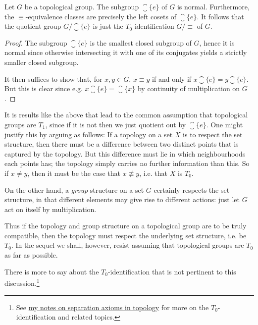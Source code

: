 \documentclass[article, a4paper, 11pt, oneside]{memoir}
\numberwithin{equation}{chapter}
\begin{document}
\begin{proposition}
    \label{thm:quotient-group-T0-identification}
    Let $G$ be a topological group. The subgroup $\closure{\{e\}}$ of $G$ is normal. Furthermore, the $\equiv$-equivalence classes are precisely the left cosets of $\closure{\{e\}}$. It follows that the quotient group $G / \closure{\{e\}}$ is just the $T_0$-identification $G/{\equiv}$ of $G$.
\end{proposition}

\begin{proof}
    The subgroup $\closure{\{e\}}$ is the smallest closed subgroup of $G$, hence it is normal since otherwise intersecting it with one of its conjugates yields a strictly smaller closed subgroup.

    It then suffices to show that, for $x,y \in G$, $x \equiv y$ if and only if $x \closure{\{e\}} = y \closure{\{e\}}$. But this is clear since e.g. $x \closure{\{e\}} = \closure{\{x\}}$ by continuity of multiplication on $G$.
\end{proof}

It is results like the above that lead to the common assumption that topological groups are $T_1$, since if it is not then we just quotient out by $\closure{\{e\}}$. One might justify this by arguing as follows: If a topology on a set $X$ is to respect the set structure, then there must be a difference between two distinct points that is captured by the topology. But this difference must lie in which neighbourhoods each points has; the topology simply carries no further information than this. So if $x \neq y$, then it must be the case that $x \not\equiv y$, i.e. that $X$ is $T_0$.

On the other hand, a \emph{group} structure on a set $G$ certainly respects the set structure, in that different elements may give rise to different actions: just let $G$ act on itself by multiplication.

Thus if the topology and group structure on a topological group are to be truly compatible, then the topology must respect the underlying set structure, i.e. be $T_0$. In the sequel we shall, however, resist assuming that topological groups are $T_0$ as far as possible.

There is more to say about the $T_0$-identification that is not pertinent to this discussion.\footnote{See \href{https://github.com/dnhansen/topology-separation-axioms}{my notes on separation axioms in topology} for more on the $T_0$-identification and related topics.}
\end{document}
